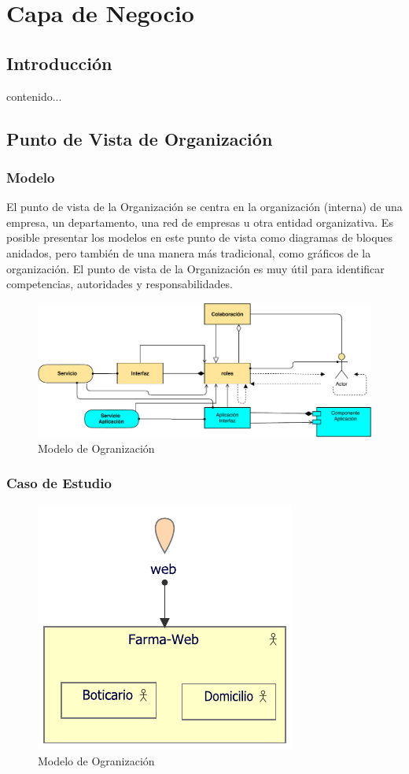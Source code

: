 \chapter{Capa de Negocio}
\section{Introducción}
contenido...
\newpage
\section{Punto de Vista de Organización}
\subsection{Modelo}
El punto de vista de la Organización se centra en la organización (interna) de una empresa, un departamento, una red de empresas u otra entidad organizativa. Es posible presentar los modelos en este punto de vista como diagramas de bloques anidados, pero también de una manera más tradicional, como gráficos de la organización. El punto de vista de la Organización es muy útil para identificar competencias, autoridades y responsabilidades.\\

\begin{figure}[h!]
	\centering
	\includegraphics[width=1\linewidth]{ARQUITECTURA/imgs/MOrganizacion}
	\caption{Modelo de Ogranización}
\end{figure}


\newpage
\subsection{Caso de Estudio}

\begin{figure}[h!]
	\centering
	\includegraphics[width=.5\linewidth]{ARQUITECTURA/imgs/COrganizacion}
	\caption{Modelo de Ogranización}
\end{figure}

